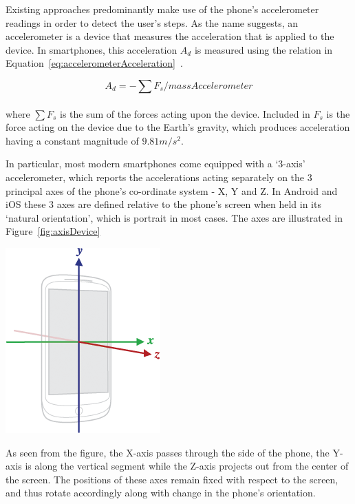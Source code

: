 \documentclass[main.tex]{subfiles}
\begin{document}
Existing approaches predominantly make use of the phone's accelerometer readings in order to detect the user's steps. As the name suggests, an accelerometer is a device that measures the acceleration that is applied to the device. In smartphones, this acceleration $A_{d}$ is measured using the relation in 
Equation~\ref{eq:accelerometerAcceleration}~\cite{accelerometerAcceleration}.  

\begin{equation}\label{eq:accelerometerAcceleration}
A_{d} = - \sum F_{s}/massAccelerometer
\end{equation}
\\
where $\sum F_{s}$ is the sum of the forces acting upon the device. Included in $F_{s}$ is the force acting on the device due to the Earth's gravity, which produces acceleration having a constant magnitude of $9.81 m/s^2$. 

In particular, most modern smartphones come equipped with a `3-axis' accelerometer, which reports the accelerations acting separately on the 3 principal axes of the phone's co-ordinate system - X, Y and Z. In Android and iOS these 3 axes are defined relative to the phone's screen when held in its `natural orientation', which is portrait in most cases. The axes are illustrated in Figure~\ref{fig:axisDevice}

\begin{center}
\includegraphics[scale=0.5]{images/axisDevice.png}
\label{fig:axisDevice}
\end{center}

As seen from the figure, the X-axis passes through the side of the phone, the Y-axis is along the vertical segment while the Z-axis projects out from the center of the screen. The positions of these axes remain fixed with respect to the screen, and thus rotate accordingly along with change in the phone's orientation. 
\end{document}
